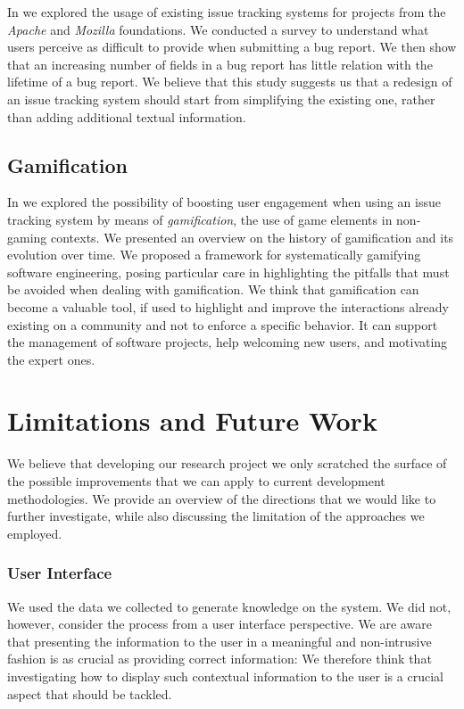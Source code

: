 In  we explored the usage of existing issue tracking systems for projects from the \emph{Apache} and \emph{Mozilla} foundations.
We conducted a survey to understand what users perceive as difficult to provide when submitting a bug report.
We then show that an increasing number of fields in a bug report has little relation with the lifetime of a bug report.
We believe that this study suggests us that a redesign of an issue tracking system should start from simplifying the existing one, rather than adding additional textual information.


\subsection{Gamification}

In  we explored the possibility of boosting user engagement when using an issue tracking system by means of \emph{gamification}, the use of game elements in non-gaming contexts.
We presented an overview on the history of gamification and its evolution over time.
We proposed a framework for systematically gamifying software engineering, posing particular care in highlighting the pitfalls that must be avoided when dealing with gamification.
We think that gamification can become a valuable tool, if used to highlight and improve the interactions already existing on a community and not to enforce a specific behavior.
It can support the management of software projects, help welcoming new users, and motivating the expert ones.



\section{Limitations and Future Work}

We believe that developing our research project we only scratched the surface of the possible improvements that we can apply to current development methodologies.
We provide an overview of the directions that we would like to further investigate, while also discussing the limitation of the approaches we employed.

\subsubsection{User Interface}

We used the data we collected to generate knowledge on the system.
We did not, however, consider the process from a user interface perspective.
We are aware that presenting the information to the user in a meaningful and non-intrusive fashion is as crucial as providing correct information: We therefore think that investigating how to display such contextual information to the user is a crucial aspect that should be tackled.


